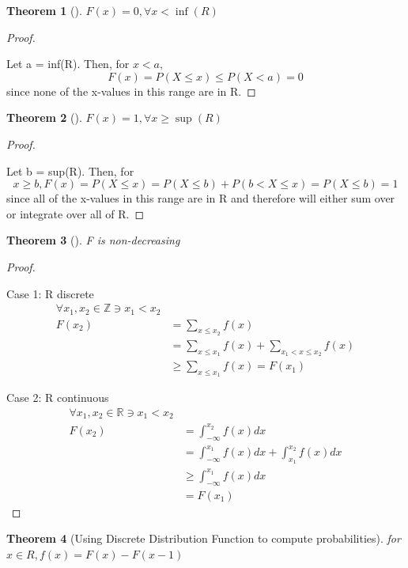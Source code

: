 \documentclass[10pt,]{book}
\theoremstyle{plain}
\newtheorem{theorem}{Theorem}[section]
\theoremstyle{definition}
\theoremstyle{definition}
\theoremstyle{definition}
\numberwithin{equation}{section}
\newcommand{\lt}{ < }
\begin{document}
\begin{theorem}[{}]\label{theorem-Fmin}
\(F(x)=0, \forall x \lt \inf(R)\)\end{theorem}
\begin{proof}\hypertarget{proof-22}{}

		Let a = inf(R). Then, for \(x \lt a,\)
		\begin{equation*}F(x) = P(X \le x) \le P(X \lt a) = 0\end{equation*} 
		since none of the x-values in this range are in R.
\end{proof}
\begin{theorem}[{}]\label{theorem-Fmax}
\(F(x)=1, \forall x \ge \sup(R)\)\end{theorem}
\begin{proof}\hypertarget{proof-23}{}

		Let b = sup(R). Then, for 
		\begin{equation*}x \ge b, F(x) = P(X \le x)  = P(X \le b) + P( b \lt X \le x) = P(X \le b) = 1\end{equation*} 
		since all of the x-values in this range are in R and therefore will either sum over or integrate over all of R.
\end{proof}
\begin{theorem}[{}]\label{theorem-23}
F is non-decreasing\end{theorem}
\begin{proof}\hypertarget{proof-24}{}
Case 1: R discrete%
\begin{align*}
\forall x_1,x_2 \in \mathbb{Z} \ni x_1 \lt x_2\\
F(x_2) & = \sum_{x \le x_2} f(x) \\
& = \sum_{x \le x_1} f(x) + \sum_{x_1 \lt x \le x_2} f(x)\\
& \ge \sum_{x \le x_1} f(x) = F(x_1)
\end{align*}\par
Case 2: R continuous%
\begin{align*}
\forall x_1,x_2 \in \mathbb{R} \ni x_1 \lt x_2\\
F(x_2) & = \int_{-\infty}^{x_2} f(x) dx \\
 & = \int_{-\infty}^{x_1} f(x) dx + \int_{x_1}^{x_2} f(x) dx\\
 & \ge \int_{-\infty}^{x_1} f(x) dx\\
 & = F(x_1)
\end{align*}\end{proof}
\begin{theorem}[{Using Discrete Distribution Function to compute probabilities}]\label{theorem-Fvsf-discrete}
for \(x \in R, f(x) = F(x) - F(x-1)\)\end{theorem}
\end{document}
